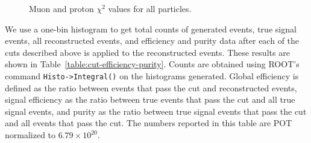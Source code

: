 \documentclass{article}
\begin{document}
\begin{figure}
    \centering
    \caption{Muon and proton $\chi^2$ values for all particles.}
    \label{fig:chi-2-variables}
\end{figure}

We use a one-bin histogram to get total counts of generated events, true signal events, all reconstructed events, and efficiency and purity data after each of the cuts described above is applied to the reconstructed events. 
These results are shown in Table~\ref{table:cut-efficiency-purity}. Counts are obtained using ROOT's command \verb|Histo->Integral()| on the histograms generated. 
Global efficiency is defined as the ratio between events that pass the cut and reconstructed events, signal efficiency as the ratio between true events that pass the cut and all true signal events, and purity as the ratio between true signal events that pass the cut and all events that pass the cut.
The numbers reported in this table are POT normalized to $6.79 \times 10^{20}$.
\end{document}
